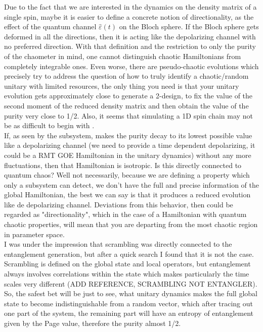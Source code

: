 Due to the fact that we are interested in the dynamics on the density matrix of a single spin, maybe it is easier to define a concrete notion of directionality, as the effect of the quantum channel $\hat{\varepsilon}(t)$ on the Bloch sphere. If the Bloch sphere gets deformed in all the directions, then it is acting like the depolarizing channel with no preferred direction. With that definition and the restriction to only the purity of the chaometer in mind, one cannot distinguish chaotic Hamiltonians from completely integrable ones. Even worse, there are pseudo-chaotic evolutions\cite{Lee2024, Maziero2015RandomSampling, Gu2024Pseudochaotic, Lubkin1978Entropy} which precisely try to address the question of how to truly identify a chaotic/random unitary with limited resources, the only thing you need is that your unitary evolution gets approximately close to generate a 2-design, to fix the value of the second moment of the reduced density matrix and then obtain the value of the purity very close to 1/2. Also, it seems that simulating a 1D spin chain may not be as difficult to begin with \cite{PhysRevLett.97.157202}.\\

If, as seen by the subsystem, makes the purity decay to its lowest possible value like a depolarizing channel (we need to provide a time dependent depolarizing, it could be a RMT GOE Hamiltonian in the unitary dynamics) without any more fluctuations, then that Hamiltonian is isotropic. Is this directly connected to quantum chaos? Well not necessarily, because we are defining a property which only a subsystem can detect, we don't have the full and precise information of the global Hamiltonian, the best we can say is that it produces a reduced evolution like de depolarizing channel. Deviations from this behavior, then could be regarded as "directionality", which in the case of a Hamiltonian with quantum chaotic properties, will mean that you are departing from the most chaotic region in parameter space.\\

I was under the impression that scrambling was directly connected to the entanglement generation, but after a quick search I found that it is not the case. Scrambling is defined on the global state and local operators, but entanglement always involves correlations within the state which makes particularly the time scales very different (ADD REFERENCE, SCRAMBLING NOT ENTANGLER). So, the safest bet will be just to see, what unitary dynamics makes the full global state to become indistinguishable from a random vector, which after tracing out one part of the system, the remaining part will have an entropy of entanglement given by the Page value, therefore the purity almost 1/2.\\


